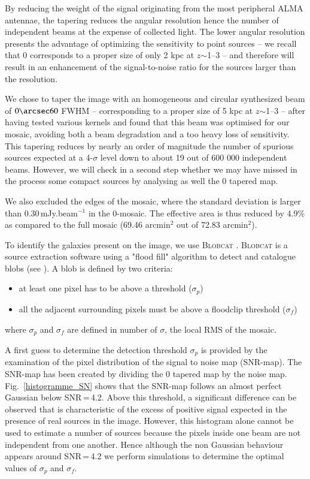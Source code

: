 \documentclass[longauth]{aa}
\begin{document}
By reducing the weight of the signal originating from the most peripheral ALMA antennae, the tapering reduces the angular resolution hence the number of independent beams at the expense of collected light. The lower angular resolution presents the advantage of optimizing the sensitivity to point sources -- we recall that 0 corresponds to a proper size of only 2 kpc at $z$$\sim$1--3 --  and therefore will result in an enhancement of the signal-to-noise ratio for the sources larger than the resolution.

We chose to taper the image with an homogeneous and circular synthesized beam of $0\arcsec60$ FWHM -- corresponding to a proper size of 5 kpc at $z$$\sim$1--3 -- after having tested various kernels and found that this beam was optimised for our mosaic, avoiding both a beam degradation and a too heavy loss of sensitivity. This tapering reduces by nearly an order of magnitude the number of spurious sources expected at a 4-$\sigma$ level down to about 19 out of 600 000 independent beams. However, we will check in a second step whether we may have missed in the process some compact sources by analysing as well the 0 tapered map. 

We also excluded the edges of the mosaic, where the standard deviation is larger than 0.30\,mJy.beam$^{-1}$ in the 0-mosaic. The effective area is thus reduced by 4.9\% as compared to the full mosaic (69.46 arcmin$^2$ out of 72.83 arcmin$^2$). 

To identify the galaxies present on the image, we use \textsc{Blobcat} \citep{Hales2012}. \textsc{Blobcat} is a source extraction software using a "flood fill" algorithm to detect and catalogue  blobs (see \citealt{Hales2012}). A blob is defined by two criteria:
\begin{itemize}
\item at least one pixel has to be above a threshold ($\sigma_p$)
\item all the adjacent surrounding pixels must be above a floodclip threshold ($\sigma_f$)
\end{itemize}
where $\sigma_p$ and $\sigma_f$ are defined in number of $\sigma$, the local RMS of the mosaic.

A first guess to determine the detection threshold $\sigma_p$ is provided by the examination of the pixel distribution of the signal to noise map (SNR-map). The SNR-map has been created by dividing the 0 tapered map by the noise map. Fig.~\ref{histogramme_SN} shows that the SNR-map follows an almost perfect Gaussian below SNR\,=\,4.2. Above this threshold, a significant difference can be observed that is characteristic of the excess of positive signal expected in the presence of real sources in the image. However, this histogram alone cannot be used to estimate a number of sources because the pixels inside one beam are not independent from one another. Hence although the non Gaussian behaviour appears around SNR\,=\,4.2 we perform simulations to determine the optimal values of $\sigma_p$ and $\sigma_f$.
\end{document}
